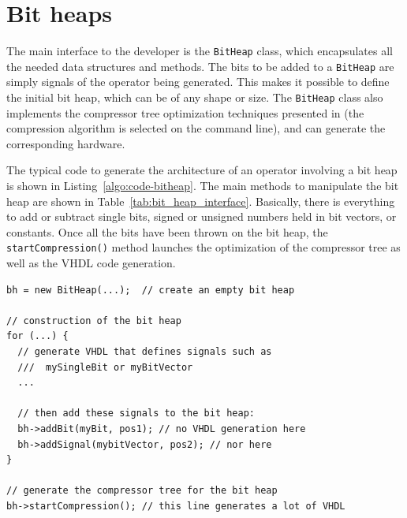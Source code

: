 \documentclass{article}
\begin{document}
\section{Bit heaps \label{sec:bitheap}}

The main interface to the developer is the  \texttt{BitHeap} class, which encapsulates all the needed data structures and methods. 
The bits to be added to a \texttt{BitHeap} are simply  signals of the operator being generated.
This makes it possible to define the initial bit heap, which can be of any shape or size. 
The \texttt{BitHeap} class also implements the compressor tree optimization techniques presented in \cite{DinIstSer2013-FPL-BitHeap,kz14a,kz14b,kk18} (the compression algorithm is selected on the command line), and can generate the corresponding hardware.



The typical code to generate the architecture of an operator involving a bit heap is shown in Listing~\ref{algo:code-bitheap}.
The main methods to manipulate the bit heap are shown in Table~\ref{tab:bit_heap_interface}.
Basically, there is everything to add or subtract single bits, signed or unsigned numbers held in bit vectors, or constants. 
Once all the bits have been thrown on the bit heap, the \texttt{startCompression()} method launches the optimization of the compressor tree as well as the VHDL code generation.



\begin{lstlisting}[float, caption=Typical code for an operator involving a bit heap, label=algo:code-bitheap]
bh = new BitHeap(...);  // create an empty bit heap

// construction of the bit heap
for (...) {
  // generate VHDL that defines signals such as
  ///  mySingleBit or myBitVector
  ...
  
  // then add these signals to the bit heap: 
  bh->addBit(myBit, pos1); // no VHDL generation here 
  bh->addSignal(mybitVector, pos2); // nor here
}

// generate the compressor tree for the bit heap
bh->startCompression(); // this line generates a lot of VHDL
\end{lstlisting}
\end{document}

